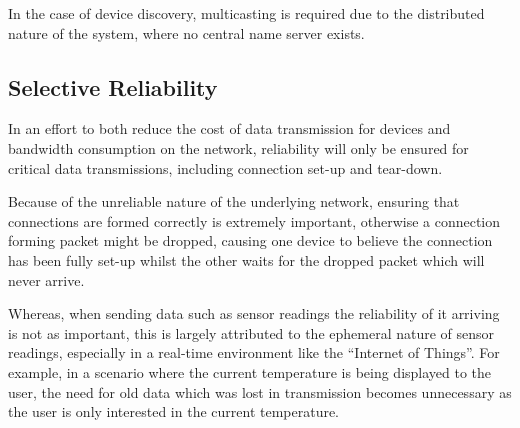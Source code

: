 In the case of device discovery, multicasting is required due to the distributed nature of the system, where no central name server exists. 
\subsection{Selective Reliability} %
\label{sub:selective_reliability}
In an effort to both reduce the cost of data transmission for devices and bandwidth consumption on the network, reliability will only be ensured for critical data transmissions, including connection set-up and tear-down.

Because of the unreliable nature of the underlying network, ensuring that connections are formed correctly is extremely important, otherwise a connection forming packet might be dropped, causing one device to believe the connection has been fully set-up whilst the other waits for the dropped packet which will never arrive. 

Whereas, when sending data such as sensor readings the reliability of it arriving is not as important, this is largely attributed to the ephemeral nature of sensor readings, especially in a real-time environment like the ``Internet of Things''. For example, in a scenario where the current temperature is being displayed to the user, the need for old data which was lost in transmission becomes unnecessary as the user is only interested in the current temperature.


